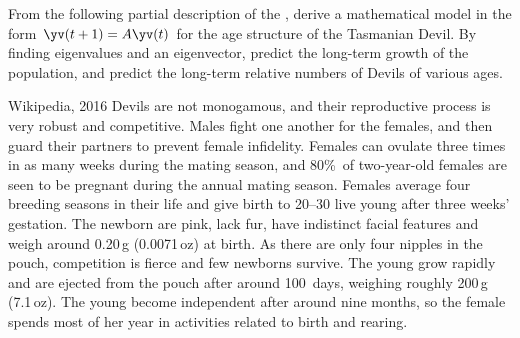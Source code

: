 \begin{exercise} \label{ex:} 
From the following partial description of the , 
derive a mathematical model in the form \(\yv(t+1)=A\yv(t)\) for the age structure of the Tasmanian Devil.
By finding eigenvalues and an eigenvector, predict the long-term growth of the population, and predict the long-term relative numbers of Devils of various ages.
\begin{quoted}{Wikipedia, 2016}
Devils are not monogamous, and their reproductive process is very robust and competitive. Males fight one another for the females, and then guard their partners to prevent female infidelity. Females can ovulate three times in as many weeks during the mating season, and 80\%~of two-year-old females are seen to be pregnant during the annual mating season. Females average four breeding seasons in their life and give birth to 20--30 live young after three weeks' gestation. The newborn are pink, lack fur, have indistinct facial features and weigh around 0.20\,g (0.0071\,oz) at birth. As there are only four nipples in the pouch, competition is fierce and few newborns survive. The young grow rapidly and are ejected from the pouch after around 100~days, weighing roughly 200\,g (7.1\,oz). The young become independent after around nine months, so the female spends most of her year in activities related to birth and rearing.
\end{quoted}
\end{exercise}






